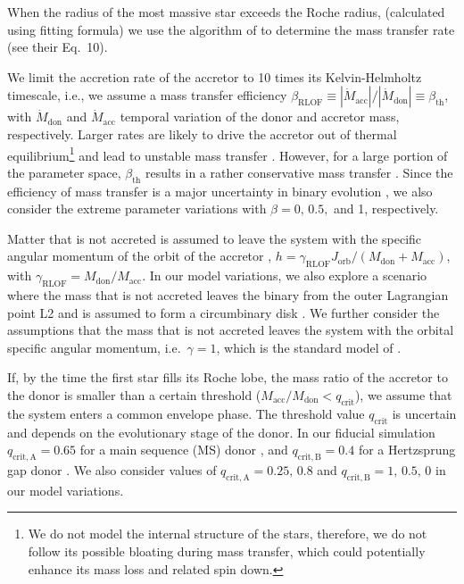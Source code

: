 \documentclass{aa}
\begin{document}
When the radius of the most massive star exceeds the Roche radius,
(calculated using \citealt{eggleton:83} fitting formula)
we use the algorithm of \cite{claeys:14} to determine the
mass transfer rate (see their Eq.~10).

We limit the accretion rate of the
accretor to 10 times its Kelvin-Helmholtz timescale, i.e., we assume a
mass transfer efficiency $\beta_\mathrm{RLOF}\equiv |
\dot{M}_\mathrm{acc}|/|\dot{M}_\mathrm{don}|\equiv
\beta_\mathrm{th}$, with $\dot{M}_\mathrm{don}$ and
$\dot{M}_\mathrm{acc}$ temporal variation of the donor and accretor mass, respectively. Larger rates are
likely to drive the accretor out of thermal equilibrium\footnote{We do
not model the internal structure of the stars, therefore, we do not
follow its possible bloating during mass transfer, which could
potentially enhance its mass loss and related spin down.} and lead to
unstable mass transfer \citep[][]{neo:77,hurley:02}. However, for a
large portion of the parameter space, $\beta_\mathrm{th}$ results in a
rather conservative mass transfer \citep[][]{schneider:15}. Since the
efficiency of mass transfer is a major uncertainty in binary evolution
\citep[][]{demink:07}, we also consider the extreme parameter
variations with $\beta=0,\,0.5,$ and 1, respectively. 
 
Matter that is not accreted is assumed to leave the system with
the specific angular momentum of the orbit of the accretor
\citep[e.g.,][]{soberman:97,vandenheuvel:17}, $h = \gamma_\mathrm{RLOF}
J_\mathrm{orb}/(M_\mathrm{don}+M_\mathrm{acc})$,
with $\gamma_\mathrm{RLOF}=M_\mathrm{don}/M_\mathrm{acc}$. In our
model variations, we also explore a scenario where the mass that is not
accreted leaves the binary from the outer Lagrangian point L2 and is assumed to form a circumbinary disk \citep[i.e.,
$\gamma_\mathrm{RLOF}=\sqrt{2}(M_\mathrm{don}+M_\mathrm{acc})^2/(M_\mathrm{acc}M_\mathrm{don})\equiv
\gamma_\mathrm{disk}$,][]{artymowicz:94}. We further consider the
assumptions that the mass that is not accreted leaves the system with the
orbital specific angular momentum, i.e.~$\gamma=1$, which is the standard model of \cite{belczynski:08, dominik:12, dominik:13}.

If, by the time the first star fills its Roche lobe, the mass
ratio of the accretor to the donor is smaller than a certain threshold
($M_\mathrm{acc}/M_\mathrm{don}<q_\mathrm{crit}$), we assume that the
system enters a common envelope phase. The threshold value
$q_\mathrm{crit}$ is uncertain and
depends on the evolutionary stage of the donor. In our fiducial simulation $q_\mathrm{crit,A}=0.65$ for a
main sequence (MS) donor \citep[][]{demink:07}, and $q_\mathrm{crit,B}=0.4$ for a Hertzsprung gap
donor \citep[][]{hurley:02}.
We also consider values of $q_\mathrm{crit,A}=0.25,\,0.8$ and $q_\mathrm{crit,B}=1,\,0.5,\,0$
in our model variations.
\end{document}
